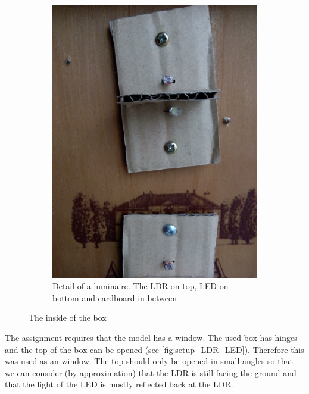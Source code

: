 \begin{figure}[h]
\begin{subfigure}[t]{0.49\textwidth}
        \centering
        \includegraphics[width=\textwidth]{img/setup_LDR_LED}
        \caption{Detail of a luminaire. The LDR on top, LED on bottom and cardboard in between}
        \label{fig:setup_LDR_LED}
    \end{subfigure}
    \caption{The inside of the box}
    \label{fig:setup_box_inside}
\end{figure}

The assignment requires that the model has a window. The used box has hinges and the top of the box can be opened (see \autoref{fig:setup_LDR_LED}). Therefore this was used as an window. The top should only be opened in small angles so that we can consider (by approximation) that the LDR is still facing the ground and that the light of the LED is mostly reflected back at the LDR.


